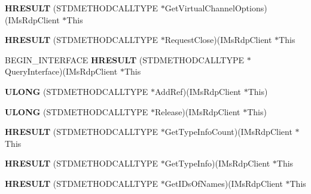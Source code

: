 \begin{DoxyCompactItemize}
\mbox{\label{struct_i_ms_rdp_client_vtbl_af097637a3a379026ecf05ccd1b99b9b3}} 
{\bfseries H\+R\+E\+S\+U\+LT} (S\+T\+D\+M\+E\+T\+H\+O\+D\+C\+A\+L\+L\+T\+Y\+PE $\ast$Get\+Virtual\+Channel\+Options)(I\+Ms\+Rdp\+Client $\ast$This
\item 
\mbox{\label{struct_i_ms_rdp_client_vtbl_a9d69f4bf407303cc9870abbc32908667}} 
{\bfseries H\+R\+E\+S\+U\+LT} (S\+T\+D\+M\+E\+T\+H\+O\+D\+C\+A\+L\+L\+T\+Y\+PE $\ast$Request\+Close)(I\+Ms\+Rdp\+Client $\ast$This
\item 
\mbox{\label{struct_i_ms_rdp_client_vtbl_a40051a35442e49c890c9f26c8c7439e8}} 
B\+E\+G\+I\+N\+\_\+\+I\+N\+T\+E\+R\+F\+A\+CE {\bfseries H\+R\+E\+S\+U\+LT} (S\+T\+D\+M\+E\+T\+H\+O\+D\+C\+A\+L\+L\+T\+Y\+PE $\ast$Query\+Interface)(I\+Ms\+Rdp\+Client $\ast$This
\item 
\mbox{\label{struct_i_ms_rdp_client_vtbl_aaccd9a48dcce9b960dd833a2dcf9b847}} 
{\bfseries U\+L\+O\+NG} (S\+T\+D\+M\+E\+T\+H\+O\+D\+C\+A\+L\+L\+T\+Y\+PE $\ast$Add\+Ref)(I\+Ms\+Rdp\+Client $\ast$This)
\item 
\mbox{\label{struct_i_ms_rdp_client_vtbl_a1dc054f74ee834a8cb1c32597dc845a3}} 
{\bfseries U\+L\+O\+NG} (S\+T\+D\+M\+E\+T\+H\+O\+D\+C\+A\+L\+L\+T\+Y\+PE $\ast$Release)(I\+Ms\+Rdp\+Client $\ast$This)
\item 
\mbox{\label{struct_i_ms_rdp_client_vtbl_a41ec3c982552209948c9a595a58466f7}} 
{\bfseries H\+R\+E\+S\+U\+LT} (S\+T\+D\+M\+E\+T\+H\+O\+D\+C\+A\+L\+L\+T\+Y\+PE $\ast$Get\+Type\+Info\+Count)(I\+Ms\+Rdp\+Client $\ast$This
\item 
\mbox{\label{struct_i_ms_rdp_client_vtbl_a52dd99069fb9a18e23ace8d6f7b84234}} 
{\bfseries H\+R\+E\+S\+U\+LT} (S\+T\+D\+M\+E\+T\+H\+O\+D\+C\+A\+L\+L\+T\+Y\+PE $\ast$Get\+Type\+Info)(I\+Ms\+Rdp\+Client $\ast$This
\item 
\mbox{\label{struct_i_ms_rdp_client_vtbl_a23a1af0db36d5d62d61b91f4f5f02d74}} 
{\bfseries H\+R\+E\+S\+U\+LT} (S\+T\+D\+M\+E\+T\+H\+O\+D\+C\+A\+L\+L\+T\+Y\+PE $\ast$Get\+I\+Ds\+Of\+Names)(I\+Ms\+Rdp\+Client $\ast$This

\end{DoxyCompactItemize}
